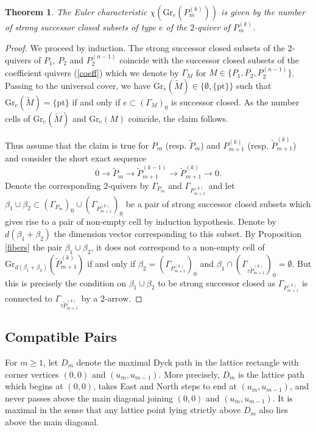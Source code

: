 \documentclass{amsart}
\newtheorem{theorem}{Theorem}[section]
\newcommand{\pt}{\mathrm{pt}}
\newcommand{\Gr}{\mathrm{Gr}}
\newcommand{\ses}[3]{0\rightarrow #1\rightarrow #2\rightarrow#3\rightarrow 0}
\begin{document}
\begin{theorem}
  The Euler characteristic $\chi(\Gr_e(P_m^{(k)}))$ is given by the number of strong successor closed subsets of type $e$ of the $2$-quiver of $P_m^{(k)}$.
\end{theorem}
\begin{proof}
  We proceed by induction.
  The strong successor closed subsets of the $2$-quivers of $P_1$, $P_2$ and $P_2^{(n-1)}$ coincide with the successor closed subsets of the coefficient quivers (\ref{coeff}) which we denote by $\Gamma_M$ for $M\in\{P_1, P_2,P_2^{(n-1)}\}$.
  Passing to the universal cover, we have $\Gr_e(\tilde M)\in\{\emptyset,\{\pt\}\}$ such that $\Gr_e(\tilde M)=\{\pt\}$ if and only if $e\subset (\Gamma_M)_0$ is successor closed.
  As the number cells of $\Gr_e(\tilde M)$ and $\Gr_e(M)$ coincide, the claim follows.

  Thus assume that the claim is true for $P_m$ (resp. $\tilde P_{m}$) and $P_{m+1}^{(k)}$ (resp. $\tilde P_{m+1}^{(k)}$) and consider the short exact sequence
  \[
    \ses{\tilde P_m}{\tilde P_{m+1}^{(k-1)}}{\tilde P_{m+1}^{(k)}}.
  \]
  Denote the corresponding $2$-quivers by $\Gamma_{P_m}$ and $\Gamma_{P_{m+1}^{(k)}}$ and let $\beta_1\cup\beta_2\subset (\Gamma_{P_m})_0\cup (\Gamma_{P_{m+1}^{(k)}})_0$ be a pair of strong successor closed subsets which gives rise to a pair of non-empty cell by induction hypothesis.
  Denote by $d(\beta_1+\beta_2)$ the dimension vector corresponding to this subset.
  By Proposition \ref{fibers} the pair $\beta_1\cup\beta_2$, it does not correspond to a non-empty cell of $\Gr_{d(\beta_1+\beta_2)}(\tilde P_{m+1}^{(k)})$ if and only if $\beta_2=(\Gamma_{P_{m+1}^{(k)}})_0$ and $\beta_1\cap(\Gamma_{\tau\tilde P_{m+1}^{(k)}})_0=\emptyset$.
  But this is precisely the condition on $\beta_1\cup\beta_2$ to be strong successor closed as $\Gamma_{P_{m+1}^{(k)}}$ is connected to $\Gamma_{\tau\tilde P_{m+1}^{(k)}}$ by a $2$-arrow.
\end{proof}


\subsection{Compatible Pairs}
For $m\ge1$, let $D_m$ denote the maximal Dyck path in the lattice rectangle with corner vertices $(0,0)$ and $(u_m,u_{m-1})$.  
More precisely, $D_m$ is the lattice path which begins at $(0,0)$, takes East and North steps to end at $(u_m,u_{m-1})$, and never passes above the main diagonal joining $(0,0)$ and $(u_m,u_{m-1})$.  
It is maximal in the sense that any lattice point lying strictly above $D_m$ also lies above the main diagonal.  
\end{document}

